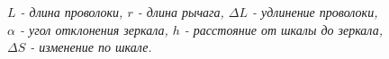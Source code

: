 \documentclass[a4paper,12pt]{report}
\begin{document}
\begin{figure}[h!]
\begin{minipage}[h!]{0.49\linewidth}
\end{minipage}
\hfill
\begin{minipage}[h!]{0.49\linewidth}
\end{minipage}
\caption{\textit{$L$ - длина проволоки, $r$ - длина рычага, $\Delta L$ - удлинение проволоки, $\alpha$ - угол отклонения зеркала, $h$ - расстояние от шкалы до зеркала, $\Delta S$ - изменение по шкале.}}
\end{figure}
\end{document}
